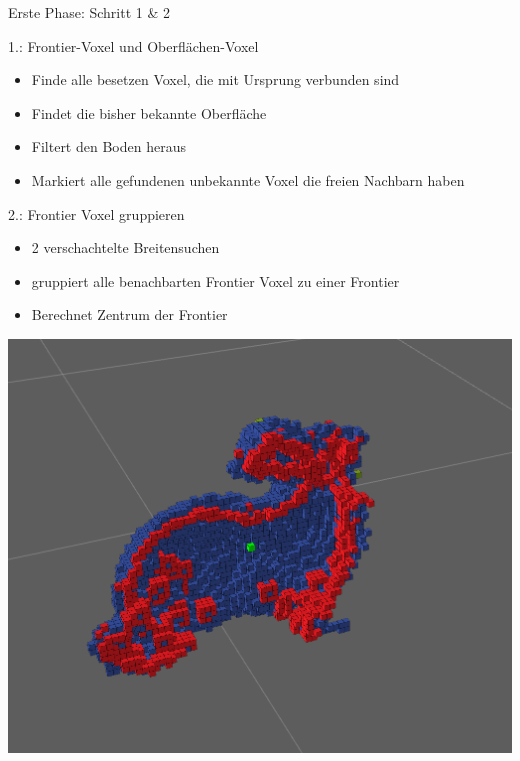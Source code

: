 \documentclass[aspectratio=169]{beamer}
\begin{document}
\begin{frame}{Erste Phase: Schritt 1 \& 2}
	\begin{minipage}{0.59\textwidth}
		\begin{block}{1.: Frontier-Voxel und Oberflächen-Voxel}
			\begin{itemize}
				\item Finde alle besetzen Voxel, die mit Ursprung verbunden sind
				\item Findet die bisher bekannte Oberfläche
				\item Filtert den Boden heraus
				\item Markiert alle gefundenen unbekannte Voxel die freien Nachbarn haben
			\end{itemize}
		\end{block}
		\begin{exampleblock}{2.: Frontier Voxel gruppieren}
			\begin{itemize}
				\item 2 verschachtelte Breitensuchen
				\item gruppiert alle benachbarten Frontier Voxel zu einer Frontier
				\item Berechnet Zentrum der Frontier
			\end{itemize}
		\end{exampleblock}
	\end{minipage}
	\hfill
	\begin{minipage}{0.39\textwidth}
		\includegraphics[width=\textwidth]{Graphics/frontiers_behind.png}
	\end{minipage}
\end{frame}
\end{document}
